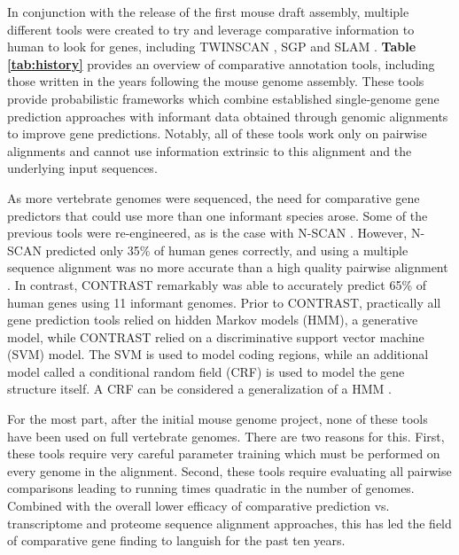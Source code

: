 \documentclass[fleqn,10pt]{wlscirep}
\begin{document}
In conjunction with the release of the first mouse draft assembly\cite{waterston2002initial}, multiple different tools were created to try and leverage comparative information to human to look for genes, including TWINSCAN \cite{flicek2003leveraging}, SGP \cite{wiehe2001sgp} and SLAM \cite{alexandersson2003slam}. \textbf{Table \ref{tab:history}} provides an overview of comparative annotation tools, including those written in the years following the mouse genome assembly. These tools provide probabilistic frameworks which combine established single-genome gene prediction approaches \cite{yeh2001computational,gelfand1996gene} with informant data obtained through genomic alignments to improve gene predictions. Notably, all of these tools work only on pairwise alignments and cannot use information extrinsic to this alignment and the underlying input sequences.

As more vertebrate genomes were sequenced, the need for comparative gene predictors that could use more than one informant species arose. Some of the previous tools were re-engineered, as is the case with N-SCAN \cite{gross2006using,van2007using}. However, N-SCAN predicted only 35\% of human genes correctly, and using a multiple sequence alignment was no more accurate than a high quality pairwise alignment \cite{flicek2007gene}. In contrast, CONTRAST \cite{gross2007contrast} remarkably was able to accurately predict 65\% of human genes using 11 informant genomes. Prior to CONTRAST, practically all gene prediction tools relied on hidden Markov models (HMM), a generative model, while CONTRAST relied on a discriminative support vector machine (SVM) model. The SVM is used to model coding regions, while an additional model called a conditional random field (CRF) is used to model the gene structure itself. A CRF can be considered a generalization of a HMM \cite{lafferty2001conditional}.

For the most part, after the initial mouse genome project, none of these tools have been used on full vertebrate genomes. There are two reasons for this. First, these tools require very careful parameter training which must be performed on every genome in the alignment. Second, these tools require evaluating all pairwise comparisons leading to running times quadratic in the number of genomes. Combined with the overall lower efficacy of comparative prediction vs. transcriptome and proteome sequence alignment approaches, this has led the field of comparative gene finding to languish for the past ten years.
\end{document}
